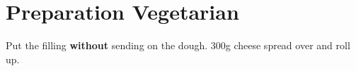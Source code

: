 \chapter{Preparation Vegetarian}
Put the filling \textbf{without} sending on the dough. 300g cheese
spread over and roll up.